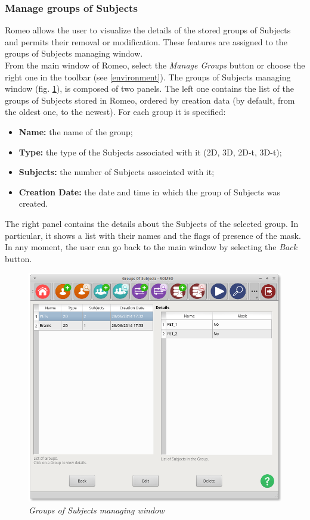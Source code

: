 \subsubsection{Manage groups of Subjects}
\label{managegroups}
Romeo allows the user to visualize the details of the stored groups of Subjects\g{} and permits their removal or modification. These features are assigned to the groups of Subjects\g{} managing window.\\
From the main window of Romeo, select the \textit{Manage Groups} button or choose the right one in the toolbar (see \ref{environment}). The groups of Subjects\g{} managing window (fig. \ref{managegroupimg}), is composed of two panels. The left one contains the list of the groups of Subjects\g{} stored in Romeo, ordered by creation data (by default, from the oldest one, to the newest). For each group it is specified:
\begin{itemize}
\item \textbf{Name:} the name of the group;
\item \textbf{Type:} the type of the Subjects\g{} associated with it (2D, 3D, 2D-t, 3D-t);
\item \textbf{Subjects:} the number of Subjects\g{} associated with it;
\item \textbf{Creation Date:} the date and time in which the group of Subjects\g{} was created.
\end{itemize}
The right panel contains the details about the Subjects\g{} of the selected group. In particular, it shows a list with their names and the flags of presence of the mask. In any moment, the user can go back to the main window by selecting the \textit{Back} button.
\begin{figure}[!h]
\begin{center}
\includegraphics[scale=0.4]{./Images/ViewGroups}
\caption{\textit{Groups of Subjects managing window}}
\label{managegroupimg}
\end{center}
\end{figure}

